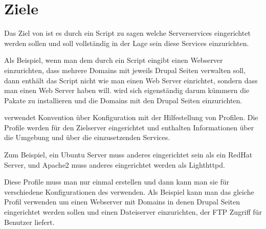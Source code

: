 \section{Ziele}

Das Ziel von \sscontrol{} ist es durch ein Script zu sagen welche Serverservices
eingerichtet werden sollen und \sscontrol{} soll vollständig in der Lage sein
diese Services einzurichten.

Als Beispiel, wenn man dem \sscontrol{} durch ein Script eingibt einen Webserver
einzurichten, dass mehrere Domains mit jeweils Drupal Seiten verwalten
soll, dann enthält das Script nicht wie man einen Web Server einrichtet,
sondern dass man einen Web Server haben will. \sscontrol{} wird sich
eigenständig darum kümmern die Pakate zu installieren und die Domains mit den
Drupal Seiten einzurichten.

\sscontrol{} verwendet Konvention über Konfiguration mit der Hilfestellung von
Profilen. Die Profile werden für den Zielserver eingerichtet und enthalten
Informationen über die Umgebung und über die einzusetzenden Services.

Zum Beispiel, ein Ubuntu Server muss anderes eingerichtet sein als ein RedHat
Server, und Apache2 muss anderes eingerichtet werden als Lighthttpd.

Diese Profile muss man nur einmal erstellen und dann kann man sie für
verschiedene Konfigurationen des \sscontrol{} verwenden. Als Beispiel kann man
das gleiche Profil verwenden um einen Webserver mit Domains in denen Drupal
Seiten eingerichtet werden sollen und einen Dateiserver einzurichten, der FTP
Zugriff für Benutzer liefert.

